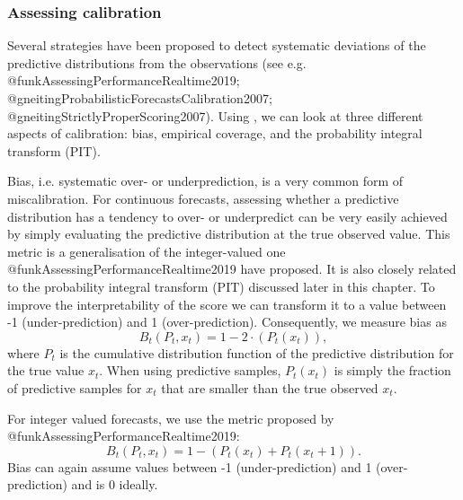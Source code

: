 \documentclass[article]{jss}
\begin{document}
\subsubsection{Assessing calibration} 

Several strategies have been proposed to detect systematic deviations of the predictive distributions from the observations (see e.g. @funkAssessingPerformanceRealtime2019; @gneitingProbabilisticForecastsCalibration2007; @gneitingStrictlyProperScoring2007). Using , we can look at three different aspects of calibration: bias, empirical coverage, and the probability integral transform (PIT). 

Bias, i.e. systematic over- or underprediction, is a very common form of miscalibration. For continuous forecasts, assessing whether a predictive distribution has a tendency to over- or underpredict can be very easily achieved by simply evaluating the predictive distribution at the true observed value. This metric is a generalisation of the integer-valued one @funkAssessingPerformanceRealtime2019 have proposed. It is also closely related to the probability integral transform (PIT) discussed later in this chapter. To improve the interpretability of the score we can transform it to a value between -1 (under-prediction) and 1 (over-prediction). Consequently, we measure bias as
$$B_t (P_t, x_t) = 1 - 2 \cdot (P_t (x_t)),$$
where $P_t$ is the cumulative distribution function of the predictive distribution for the true value $x_t$. When using predictive samples, $P_t (x_t)$ is simply the fraction of predictive samples for $x_t$ that are smaller than the true observed $x_t$.

For integer valued forecasts, we use the metric proposed by @funkAssessingPerformanceRealtime2019: 
$$B_t (P_t, x_t) = 1 - (P_t (x_t) + P_t (x_t + 1)).$$
Bias can again assume values between -1 (under-prediction) and 1 (over-prediction) and is 0 ideally. 
\end{document}
